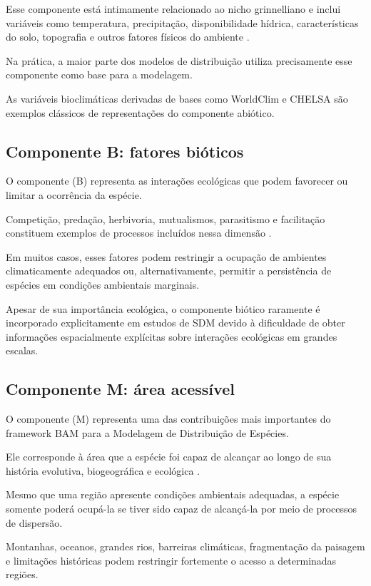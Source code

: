 Esse componente está intimamente relacionado ao nicho grinnelliano e inclui variáveis como temperatura, precipitação, disponibilidade hídrica, características do solo, topografia e outros fatores físicos do ambiente \parencite{grinnell1917,soberon2007}.

Na prática, a maior parte dos modelos de distribuição utiliza precisamente esse componente como base para a modelagem.

As variáveis bioclimáticas derivadas de bases como WorldClim e CHELSA são exemplos clássicos de representações do componente abiótico.

\subsection{Componente B: fatores bióticos}

O componente (B) representa as interações ecológicas que podem favorecer ou limitar a ocorrência da espécie.

Competição, predação, herbivoria, mutualismos, parasitismo e facilitação constituem exemplos de processos incluídos nessa dimensão \parencite{elton1927,wisz2013}.

Em muitos casos, esses fatores podem restringir a ocupação de ambientes climaticamente adequados ou, alternativamente, permitir a persistência de espécies em condições ambientais marginais.

Apesar de sua importância ecológica, o componente biótico raramente é incorporado explicitamente em estudos de SDM devido à dificuldade de obter informações espacialmente explícitas sobre interações ecológicas em grandes escalas.

\subsection{Componente M: área acessível}

O componente (M) representa uma das contribuições mais importantes do framework BAM para a Modelagem de Distribuição de Espécies.

Ele corresponde à área que a espécie foi capaz de alcançar ao longo de sua história evolutiva, biogeográfica e ecológica \parencite{barve2011crucial}.

Mesmo que uma região apresente condições ambientais adequadas, a espécie somente poderá ocupá-la se tiver sido capaz de alcançá-la por meio de processos de dispersão.

Montanhas, oceanos, grandes rios, barreiras climáticas, fragmentação da paisagem e limitações históricas podem restringir fortemente o acesso a determinadas regiões.

